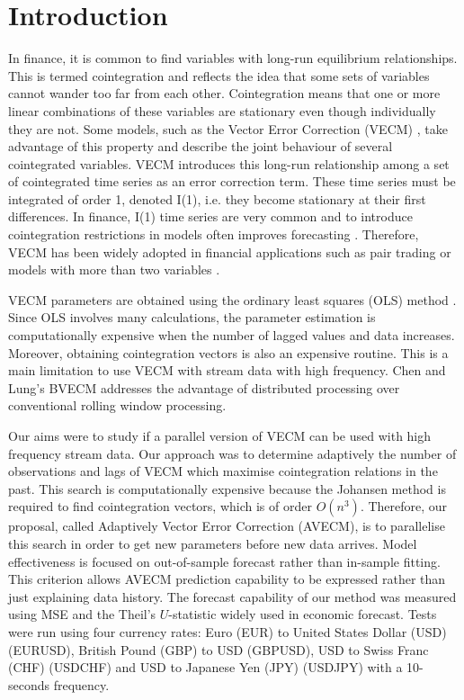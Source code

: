 \section{Introduction}
\label{sec:introduction}
In finance, it is common to find variables with long-run equilibrium
relationships. This is termed cointegration and reflects the idea that
some sets of variables cannot wander too far from each other. Cointegration
means that one or more linear combinations of these variables are stationary
even though individually they are not. Some models,
such as the Vector Error Correction (VECM) \cite{engle87}, take advantage of
this property and describe the joint behaviour of several cointegrated
variables. VECM introduces this long-run relationship among a set of cointegrated
time series as an error correction term. These time series must be integrated of order 1, denoted I(1), i.e. they become stationary at their first differences. In finance, I(1) time series are very common and 
to introduce cointegration restrictions in models often improves forecasting \cite{duy1998}. Therefore, VECM has been widely adopted in
financial applications \cite{mukherjee1995,seong2013,maysami2000,arestis2001} such as pair trading \cite{herlemont2003} or models with more than two variables \cite{mukherjee1995,engle2004}.

VECM parameters are obtained using the ordinary least squares
(OLS) method \cite{golub1980}. Since OLS involves many calculations, the parameter estimation is computationally expensive when the number of lagged values and
data increases. Moreover, obtaining cointegration vectors 
is also an expensive routine. This is a main limitation to use VECM with stream data with high frequency.
Chen and Lung's BVECM \cite{chen2003} addresses the advantage of distributed processing over conventional rolling window processing. 

Our aims were to study if a parallel version of VECM can be used with high frequency stream data.
Our approach was to determine adaptively the number of observations and lags of VECM which
maximise cointegration relations in the past. 
 This search is computationally
expensive because the Johansen
method \cite{johansen1995} is required to find cointegration vectors, which is of order $O(n^3)$. Therefore, our proposal, called Adaptively Vector Error Correction (AVECM), 
is to parallelise this search in order to get new parameters before new data arrives.
Model effectiveness is focused on out-of-sample forecast rather than in-sample
fitting. This criterion allows AVECM prediction capability to be
expressed rather than just explaining data history.
The forecast capability of our method was measured using MSE and the Theil's $U$-statistic \cite{theil1966} widely used in economic forecast. Tests were run using four currency rates: Euro (EUR) to
United States Dollar (USD) (EURUSD), British Pound (GBP) to USD (GBPUSD), USD to Swiss
Franc (CHF) (USDCHF) and USD to Japanese Yen (JPY) (USDJPY) with a 10-seconds frequency.

